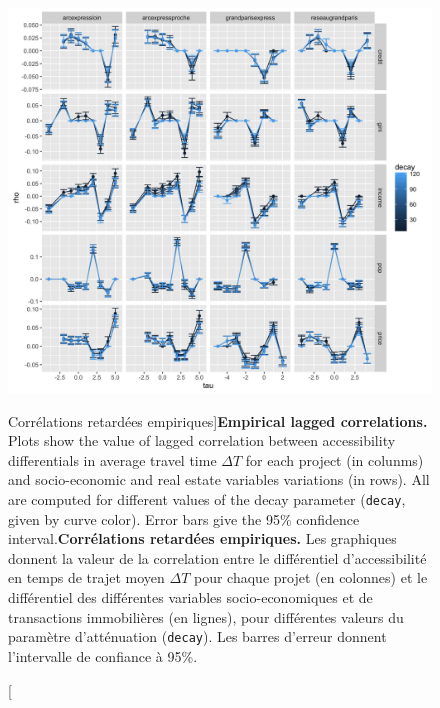 \begin{figure}[h!]
\includegraphics[width=\linewidth]{Figures/Final/1-2-1-fig-casestudies-empiricalres.jpg}
\caption[][Corrélations retardées empiriques]{\textbf{Empirical lagged correlations.} Plots show the value of lagged correlation between accessibility differentials in average travel time $\Delta T$ for each project (in colunms) and socio-economic and real estate variables variations (in rows). All are computed for different values of the decay parameter (\texttt{decay}, given by curve color). Error bars give the 95\% confidence interval.\label{fig:empiricalres}}{\textbf{Corrélations retardées empiriques.} Les graphiques donnent la valeur de la correlation entre le différentiel d'accessibilité en temps de trajet moyen $\Delta T$ pour chaque projet (en colonnes) et le différentiel des différentes variables socio-economiques et de transactions immobilières (en lignes), pour différentes valeurs du paramètre d'atténuation (\texttt{decay}). Les barres d'erreur donnent l'intervalle de confiance à 95\%.\label{fig:casestudies:empiricalres}}
\end{figure}
















